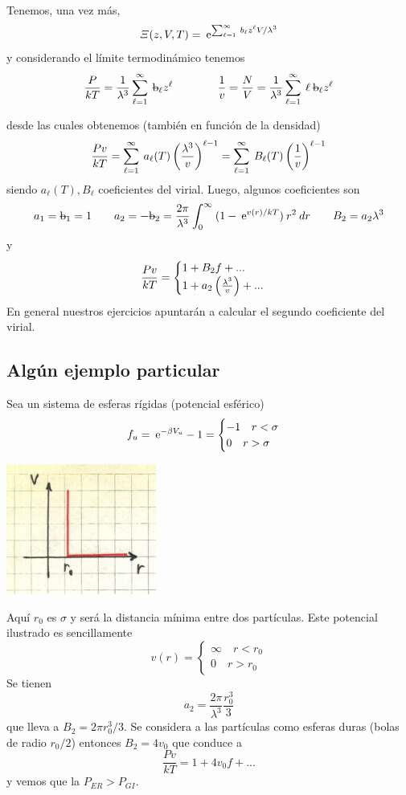 \documentclass[10pt,oneside]{CBFT_book}
\begin{document}
Tenemos, una vez más,
\[
	\Xi(z,V,T) = \:\mathrm{e}^{ \sum_{\ell=1}^\infty \: b_\ell z^\ell V / \lambda^3 }
\]
y considerando el límite termodinámico tenemos
\[
	\frac{P}{kT} = \frac{1}{\lambda^3} \sum_{\ell=1}^\infty \: \text{\sout{b}}_\ell z^\ell
	\qquad \qquad 
	\frac{1}{v} = \frac{N}{V} = \frac{1}{\lambda^3} \sum_{\ell=1}^\infty \: \ell \: \text{\sout{b}}_\ell z^\ell
\]

desde las cuales obtenemos (también en función de la densidad)
\[
	\frac{Pv}{kT} = \sum_{\ell=1}^\infty \: a_\ell(T) \left( \frac{ \lambda^3 }{ v } \right)^{\ell-1}
	= \sum_{\ell=1}^\infty \: B_\ell(T) \left( \frac{ 1 }{ v } \right)^{\ell-1}
\]
siendo $ a_\ell(T), B_\ell$ coeficientes del virial. Luego, algunos coeficientes son
\[
	a_1 = \text{\sout{b}}_1 = 1 \qquad 
	a_2 = -\text{\sout{b}}_2 = \frac{2\pi}{\lambda^3} \int_0^\infty \: ( 1 - \euler^{v(r)/kT} ) \: r^2 \: dr
	\qquad
	B_2 = a_2 \lambda^3
\]
y
\[
	\frac{Pv}{kT} = \begin{cases}
	                 1 + B_2 f + ... \\
	                 1 + a_2 \left( \frac{ \lambda^3 }{ v } \right) + ... 
	                \end{cases}
\]
En general nuestros ejercicios apuntarán a calcular el segundo coeficiente del virial.

\subsection{Algún ejemplo particular}

Sea un sistema de esferas rígidas (potencial esférico)
\[
	f_u = \:\mathrm{e}^{-\beta V_u} - 1 = \begin{cases}
	                                 -1 \quad r < \sigma \\
	                                  0 \quad r > \sigma
	                                \end{cases}
\]


\includegraphics[scale=0.4]{images/1606337089.jpg}

Aquí $r_0$ es $\sigma$ y será la distancia mínima entre dos partículas. Este potencial ilustrado
es sencillamente
\[
	v(r) = \begin{cases}
		\infty \quad r < r_0 \\
		0      \quad r > r_0
	       \end{cases}
\]
Se tienen
\[
	a_2 = \frac{2\pi}{\lambda^3} \frac{r_0^3}{3}
\]
que lleva a $B_2 = 2 \pi r_0^3 / 3$. Se considera a las partículas como esferas duras (bolas de
radio $r_0/2$) entonces $B_2 = 4 v_0$ que conduce a 
\[
	\frac{Pv}{kT} = 1 + 4 v_0 f + ...
\]
y vemos que la $P_{ER} > P_{GI}$.
\end{document}
